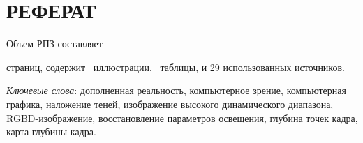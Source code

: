 \chapter*{РЕФЕРАТ}

Объем РПЗ составляет \begin{NoHyper}\pageref{LastPage}\end{NoHyper} страниц, содержит \totfig~иллюстрации, \tottab~таблицы, и 29 использованных источников.

\textit{Ключевые слова}: дополненная реальность, компьютерное зрение, компьютерная графика, наложение теней, изображение высокого динамического диапазона, RGBD-изображение, восстановление параметров освещения, глубина точек кадра, карта глубины кадра.